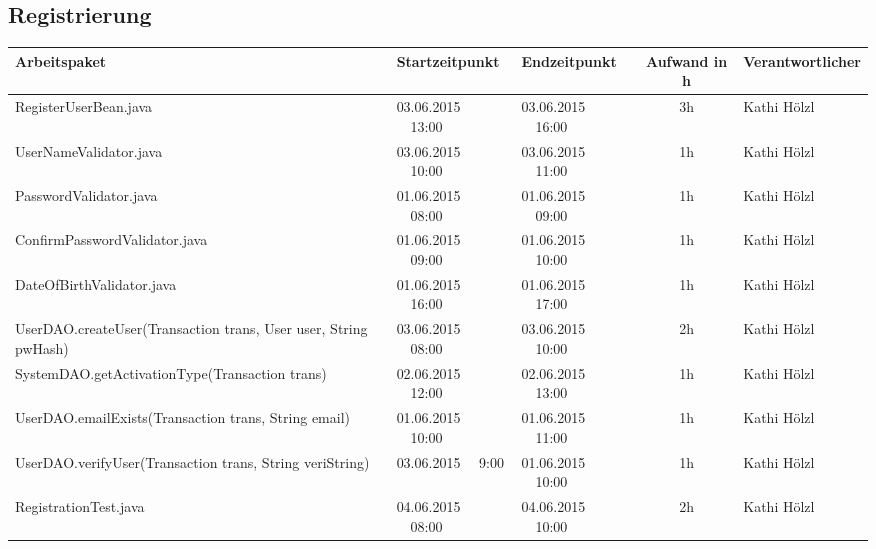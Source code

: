 \begin{landscape}
\subsection{Registrierung}
\begin{tabular}{|p{10.3cm}|p{3.2cm}|p{3.2cm}|c|p{3.5cm}|}
	\hline  \textbf{Arbeitspaket} & \textbf{Startzeitpunkt} & \textbf{Endzeitpunkt} & \textbf{Aufwand in h} & \textbf{Verantwortlicher} \\ 
	\hline   RegisterUserBean.java                                & 03.06.2015 \ \ 13:00     & 03.06.2015 \ \ 16:00     &      3h               & Kathi Hölzl\\
	\hline   UserNameValidator.java                               & 03.06.2015 \ \ 10:00     & 03.06.2015 \ \ 11:00     &      1h               & Kathi Hölzl\\
	\hline   PasswordValidator.java                               & 01.06.2015 \ \ 08:00     & 01.06.2015 \ \ 09:00     &      1h               & Kathi Hölzl\\
	\hline   ConfirmPasswordValidator.java                        & 01.06.2015 \ \ 09:00     & 01.06.2015 \ \ 10:00     &      1h               & Kathi Hölzl\\
	\hline   DateOfBirthValidator.java                            & 01.06.2015 \ \ 16:00     & 01.06.2015 \ \ 17:00     &      1h               & Kathi Hölzl\\
	\hline   UserDAO.createUser(Transaction trans, User user, String pwHash)     & 03.06.2015 \ \ 08:00     & 03.06.2015 \ \ 10:00     &      2h               & Kathi Hölzl\\
	\hline   SystemDAO.getActivationType(Transaction trans)       & 02.06.2015 \ \ 12:00     & 02.06.2015 \ \ 13:00     &      1h               & Kathi Hölzl\\
	\hline   UserDAO.emailExists(Transaction trans, String email) & 01.06.2015 \ \ 10:00     & 01.06.2015 \ \ 11:00     &      1h               & Kathi Hölzl\\
	\hline   UserDAO.verifyUser(Transaction trans, String veriString) & 03.06.2015 \ \ 9:00     & 01.06.2015 \ \ 10:00     &      1h               & Kathi Hölzl\\
	\hline   RegistrationTest.java                                & 04.06.2015 \ \ 08:00     & 04.06.2015 \ \ 10:00     &      2h               & Kathi Hölzl\\
	\hline 
\end{tabular} \ \\
\ \\


\end{landscape}
